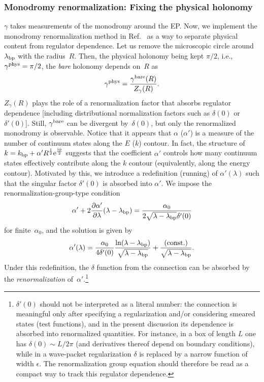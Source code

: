 \subsubsection{Monodromy renormalization: Fixing the physical holonomy}
$\gamma$ takes measurements of the monodromy around the EP.
Now, we implement the monodromy renormalization method in Ref.~\cite{Morikawa:2025ezl} as a way to separate physical content
from regulator dependence.
Let us remove the microscopic circle around~$\lambda_{\mathrm{bp}}$ with the radius~$R$.
Then, the physical holonomy being kept $\pi/2$, i.e., $\gamma^{\mathrm{phys}}=\pi/2$, the \textit{bare} holonomy depends on~$R$ as
\begin{align}
    \gamma^{\mathrm{phys}} = \frac{\gamma^{\mathrm{bare}}(R)}{Z_{\gamma}(R)} .
\end{align}
$Z_\gamma(R)$ plays the role of a renormalization factor that absorbs regulator dependence [including distributional normalization factors such as $\delta(0)$ or $\delta'(0)$].
Still, $\gamma^{\mathrm{bare}}$ can be divergent by~$\delta(0)$, but only the renormalized monodromy is observable.
Notice that it appears that $\alpha$ ($\alpha'$) is a measure of the number of continuum states along the $E$ ($k$) contour.
In fact, the structure of $k=k_{\mathrm{bp}}+\alpha' R^{\frac{1}{2}}\mathrm{e}^{\frac{\mathrm{i} \phi}{2}}$ suggests that the coefficient $\alpha'$ controls how many continuum states effectively contribute along the $k$ contour (equivalently, along the energy contour).
Motivated by this, we introduce a redefinition (running) of $\alpha'(\lambda)$ such that the singular factor $\delta'(0)$ is
absorbed into $\alpha'$.
We impose the renormalization-group-type condition
\begin{align}
    \alpha' + 2\frac{\partial\alpha'}{\partial\lambda}(\lambda-\lambda_{\mathrm{bp}}) = \frac{\alpha_0}{2\sqrt{\lambda-\lambda_{\mathrm{bp}}}\delta'(0)} \label{src:2512_24528:eq:renor_group}
\end{align}
for finite~$\alpha_0$, and the solution is given by
\begin{align}
    \alpha'(\lambda) = \frac{\alpha_0}{4\delta'(0)} \frac{\ln(\lambda-\lambda_{\mathrm{bp}})}{\sqrt{\lambda-\lambda_{\mathrm{bp}}}} + \frac{\text{(const.)}}{\sqrt{\lambda-\lambda_{\mathrm{bp}}}} .
\end{align}
Under this redefinition, the $\delta$ function from the connection can be absorbed by the \textit{renormalization} of~$\alpha'$.\footnote{$\delta'(0)$ should not be interpreted as a literal number: the connection is meaningful only after specifying a regularization and/or
considering smeared states (test functions), and in the present discussion its dependence is absorbed into renormalized quantities.
For instance, in a box of length $L$ one has $\delta(0)\sim L/2\pi$ (and derivatives thereof depend on boundary
conditions), while in a wave-packet regularization $\delta$ is replaced by a narrow function of width $\epsilon$.
The renormalization group equation should therefore be read as a compact way to track this regulator dependence.}
